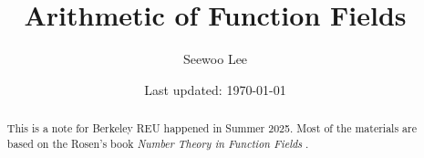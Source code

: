 \documentclass[letterpaper, 10pt]{article}
\begin{document}

\title{Arithmetic of Function Fields}


\author{Seewoo Lee}
\date{\normalsize\vspace{-1ex} Last updated: \today}


\maketitle



\begin{abstract}
This is a note for Berkeley REU happened in Summer 2025.
Most of the materials are based on the Rosen's book \textit{Number Theory in Function Fields} \cite{rosen2013number}.
\end{abstract}




\newpage










\end{document}
